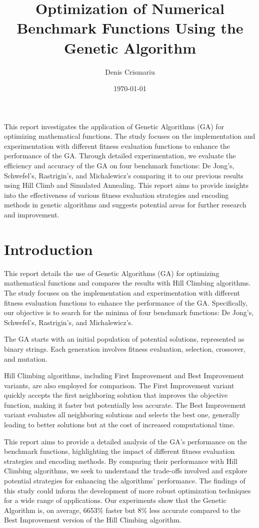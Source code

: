 \documentclass{article}
\title{Optimization of Numerical Benchmark Functions Using the Genetic Algorithm}
\author{Denis Crismariu}
\date{\today}
\begin{document}
\maketitle

\abstract
This report investigates the application of Genetic Algorithms (GA) for optimizing mathematical functions. The study focuses on the implementation and experimentation with different fitness evaluation functions to enhance the performance of the GA. Through detailed experimentation, we evaluate the efficiency and accuracy of the GA on four benchmark functions: De Jong’s, Schwefel’s, Rastrigin’s, and Michalewicz’s comparing it to our previous results using Hill Climb and Simulated Annealing. This report aims to provide insights into the effectiveness of various fitness evaluation strategies and encoding methods in genetic algorithms and suggests potential areas for further research and improvement.


\section{Introduction}
This report details the use of Genetic Algorithms (GA) for optimizing mathematical functions and compares the results with Hill Climbing algorithms. The study focuses on the implementation and experimentation with different fitness evaluation functions to enhance the performance of the GA. Specifically, our objective is to search for the minima of four benchmark functions: De Jong’s, Schwefel’s, Rastrigin’s, and Michalewicz’s.

The GA starts with an initial population of potential solutions, represented as binary strings. Each generation involves fitness evaluation, selection, crossover, and mutation. 

Hill Climbing algorithms, including First Improvement and Best Improvement variants, are also employed for comparison. The First Improvement variant quickly accepts the first neighboring solution that improves the objective function, making it faster but potentially less accurate. The Best Improvement variant evaluates all neighboring solutions and selects the best one, generally leading to better solutions but at the cost of increased computational time.

This report aims to provide a detailed analysis of the GA's performance on the benchmark functions, highlighting the impact of different fitness evaluation strategies and encoding methods. By comparing their performance with Hill Climbing algorithms, we seek to understand the trade-offs involved and explore potential strategies for enhancing the algorithms' performance. The findings of this study could inform the development of more robust optimization techniques for a wide range of applications.
Our experiments show that the Genetic Algorithm is, on average, 6653\% faster but 8\% less accurate compared to the Best Improvement version of the Hill Climbing algorithm.
\end{document}
